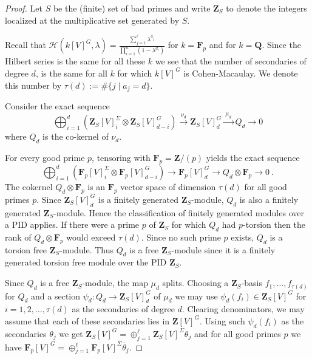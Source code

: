 \documentclass[12pt]{amsart}
\newcommand{\QQ}{\mathbf{Q}} %
\newcommand{\ZZ}{\mathbf{Z}} %
\newcommand{\FF}{\mathbf{F}} %
\newcommand{\QQ}{\mathbb{Q}} %
\newcommand{\ZZ}{\mathbb{Z}} %
\newcommand{\FF}{\mathbb{F}} %
\theoremstyle{definition}
\newcommand{\calh}{\mathcal{H}}
\newcommand{\btheta}{{\overline{\theta}}}
\begin{document}
\begin{proof}
Let $S$ be the (finite) set of bad primes and write $\ZZ_S$ to denote the integers localized at the multiplicative set generated by $S$.

Recall that $\calh(k[V]^G,\lambda)
=\frac{\sum_{j=1}^\ell \lambda^{a_j}}{\prod_{i=1}^n(1-\lambda^{d_i})}$ for $k=\FF_p$ and for $k=\QQ$.
Since the Hilbert series is the same for all these $k$  we see that the number of secondaries of degree $d$, is the same for all $k$ for which $k[V]^G$ is Cohen-Macaulay.  We denote this number by $\tau(d):=\#\{j\mid a_j = d\}$.

Consider the exact sequence
$$
\bigoplus_{i=1}^d(\ZZ_S[V]^{\Sigma}_{i} \otimes \ZZ_S[V]^G_{d-i}) \xrightarrow{~\nu_d~} \ZZ_S[V]^G_d 
\xrightarrow{~\mu_d~} Q_d \longrightarrow 0
$$
where $Q_d$ is the co-kernel of $\nu_d$. 

For every good prime $p$, tensoring with $\FF_p = \ZZ/(p)$ yields the exact sequence
$$
\bigoplus_{i=1}^d(\FF_p[V]^{\Sigma}_{i} \otimes \FF_p[V]^G_{d-i}) \longrightarrow \FF_p[V]^G_d \longrightarrow Q_d\otimes \FF_p \longrightarrow 0 \ .$$
The cokernel $Q_d\otimes \FF_p$ is an $\FF_p$ vector space of dimension $\tau(d)$ for all
good primes $p$. 
Since $\ZZ_S[V]^G_d$ is a finitely generated $\ZZ_S$-module,
$Q_d$ is also a finitely generated $\ZZ_S$-module.  Hence the classification of finitely generated modules over a PID applies.  If there were a prime $p$ of $\ZZ_S$ for which $Q_d$ had $p$-torsion 
then the rank of $Q_d \otimes \FF_p$ would exceed $\tau(d)$. 
Since no such prime $p$ exists, $Q_d$ is a torsion free $\ZZ_S$-module.
Thus $Q_d$ is a free $\ZZ_S$-module since it is a finitely generated torsion free module over 
the PID $\ZZ_S$.


Since $Q_{d}$ is a free $\ZZ_S$-module, the map $\mu_d$ splits.  
Choosing a $\ZZ_S$-basis $f_1,\dots,f_{\tau(d)}$ for $Q_d$ and a section 
$\psi_d:Q_d \to \ZZ_S[V]^G_d$ of $\mu_d$ we may use $\psi_d(f_i) \in \ZZ_S[V]^G$ for $i=1,2,\dots,\tau(d)$ as the secondaries of degree $d$.  Clearing denominators, we may assume that each of these secondaries lies in $\ZZ[V]^G$.  Using such $\psi_d(f_i)$ as the secondaries $\theta_j$ we get 
$\ZZ_S[V]^G = \oplus_{j=1}^\ell \ZZ_S[V]^{\Sigma} \theta_j$
 and for all good primes $p$ we have  $\FF_p[V]^G = \oplus_{j=1}^\ell \FF_p[V]^{\Sigma} \btheta_j$.
\end{proof}
\end{document}
